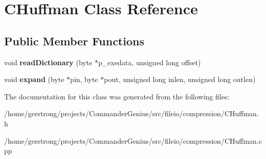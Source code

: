 \hypertarget{class_c_huffman}{
\section{CHuffman Class Reference}
\label{class_c_huffman}
}
\subsection*{Public Member Functions}
\begin{DoxyCompactItemize}
\item 
\hypertarget{class_c_huffman_a94979b2decd2412b9e29a1ac5d1b15fc}{
void {\bfseries readDictionary} (byte $\ast$p\_\-exedata, unsigned long offset)}
\label{class_c_huffman_a94979b2decd2412b9e29a1ac5d1b15fc}

\item 
\hypertarget{class_c_huffman_a0314fe700515297d846a463de7d8fbea}{
void {\bfseries expand} (byte $\ast$pin, byte $\ast$pout, unsigned long inlen, unsigned long outlen)}
\label{class_c_huffman_a0314fe700515297d846a463de7d8fbea}

\end{DoxyCompactItemize}


The documentation for this class was generated from the following files:\begin{DoxyCompactItemize}
\item 
/home/gerstrong/projects/CommanderGenius/src/fileio/compression/CHuffman.h\item 
/home/gerstrong/projects/CommanderGenius/src/fileio/compression/CHuffman.cpp\end{DoxyCompactItemize}

